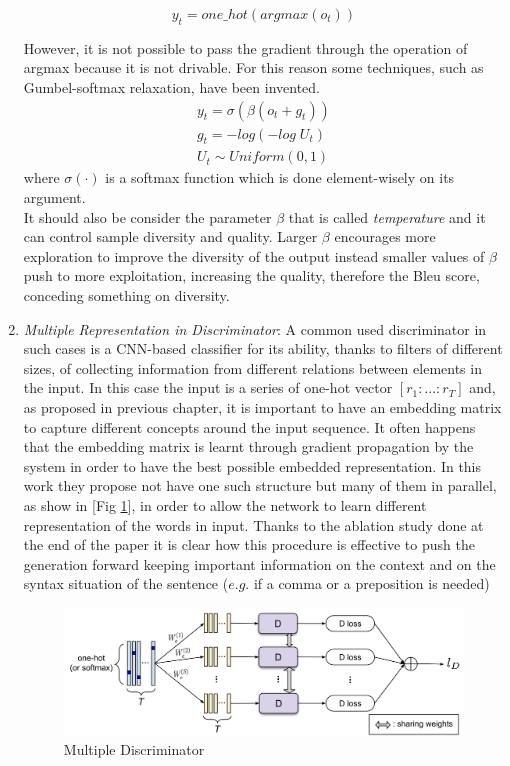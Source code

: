 \begin{enumerate}
	\begin{equation} \label{eq:ArgmaxSampling}
	y_{t} = one\_hot(arg max(o_{t})) 
	\end{equation}
	
	However, it is not possible to pass the gradient through the operation of argmax because it is not drivable. For this reason some techniques, such as Gumbel-softmax relaxation, have been invented.
	\begin{equation}
	\begin{split}
	\label{eq:gumbel}
	y_{t} = \sigma(\beta(o_{t} + g_{t})) \\
	g_{t} = -log(-log \; U_{t}) \\
	U_{t} \sim Uniform(0,1)
	\end{split}
	\end{equation}
	where $\sigma(\cdot)$ is a softmax function which is done element-wisely on its argument. \\
	It should also be consider the parameter $\beta$ that is called \textit{temperature} and it can control sample diversity and quality. Larger $\beta$ encourages more exploration to improve the diversity of the output instead smaller values of $\beta$ push to more exploitation, increasing the quality, therefore the Bleu score, conceding something on diversity. 
	\item \textit{Multiple Representation in Discriminator}: A common used discriminator in such cases is a CNN-based classifier for its ability, thanks to filters of different sizes, of collecting information from different relations between elements in the input. In this case the input is a series of one-hot vector $[r_{1} : ... : r_{T}]$ and, as proposed in previous chapter, it is important to have an embedding matrix to capture different concepts around the input sequence. It often happens that the embedding matrix is learnt through gradient propagation by the system in order to have the best possible embedded representation. In this work they propose not have one such structure but many of them in parallel, as show in [Fig \ref{img:MultipleDiscriminator}], in order to allow the network to learn different representation of the words in input. Thanks to the ablation study done at the end of the paper it is clear how this procedure is effective to push the generation forward keeping important information on the context and on the syntax situation of the sentence ($e.g.$ if a comma or a preposition is needed)
		
	\begin{figure}[h!]
		\centering
		\includegraphics[width=0.8\linewidth]{Images/MultipleDiscriminator.png}
		\caption{Multiple Discriminator}
		\label{img:MultipleDiscriminator}
	\end{figure}
\end{enumerate}

